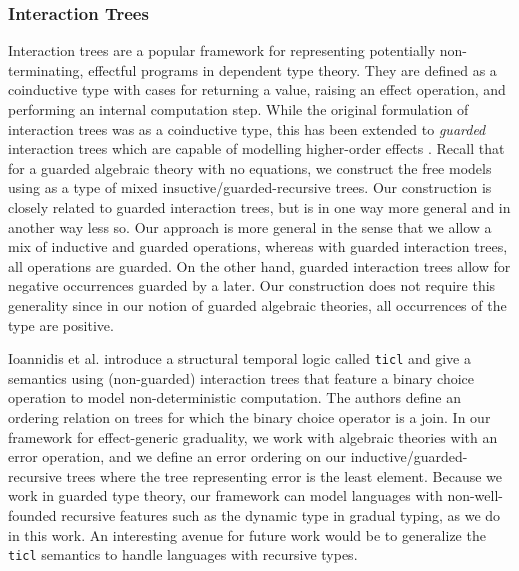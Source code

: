 \documentclass[acmsmall,screen,review,anonymous]{acmart}
\theoremstyle{remark}
\begin{document}
\subsubsection{Interaction Trees}

Interaction trees \cite{itrees} are a popular framework for representing
potentially non-terminating, effectful programs in dependent type theory. They
are defined as a coinductive type with cases for returning a value, raising an
effect operation, and performing an internal computation step.
%
While the original formulation of interaction trees was as a coinductive type,
this has been extended to \emph{guarded} interaction trees which are capable of
modelling higher-order effects \cite{guarded-interaction-trees}.
%
Recall that for a guarded algebraic theory with no equations, we construct the
free models using as a type of mixed insuctive/guarded-recursive trees. Our
construction is closely related to guarded interaction trees, but is in one way
more general and in another way less so. Our approach is more general in the
sense that we allow a mix of inductive and guarded operations, whereas with
guarded interaction trees, all operations are guarded. On the other hand,
guarded interaction trees allow for negative occurrences guarded by a later. Our
construction does not require this generality since in our notion of guarded
algebraic theories, all occurrences of the type are positive.


Ioannidis et al. introduce a structural temporal logic called \texttt{ticl}
\cite{ticl} and give a semantics using (non-guarded) interaction trees that
feature a binary choice operation to model non-deterministic computation. The
authors define an ordering relation on trees for which the binary choice
operator is a join. In our framework for effect-generic graduality, we work with
algebraic theories with an error operation, and we define an error ordering on
our inductive/guarded-recursive trees where the tree representing error is the
least element.
%
Because we work in guarded type theory, our framework can model languages with
non-well-founded recursive features such as the dynamic type in gradual typing,
as we do in this work. An interesting avenue for future work would be to
generalize the \texttt{ticl} semantics to handle languages with recursive types.
\end{document}
